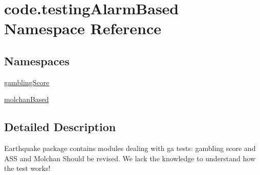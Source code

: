 \hypertarget{namespacecode_1_1testing_alarm_based}{}\section{code.\+testing\+Alarm\+Based Namespace Reference}
\label{namespacecode_1_1testing_alarm_based}
\subsection*{Namespaces}
\begin{DoxyCompactItemize}
\item 
 \hyperlink{namespacecode_1_1testing_alarm_based_1_1gambling_score}{gambling\+Score}
\item 
 \hyperlink{namespacecode_1_1testing_alarm_based_1_1molchan_based}{molchan\+Based}
\end{DoxyCompactItemize}


\subsection{Detailed Description}
\begin{DoxyVerb}Earthquake package contains modules dealing with ga tests: gambling score and ASS and Molchan
Should be revised. We lack the knowledge to understand how the test works!
\end{DoxyVerb}
 